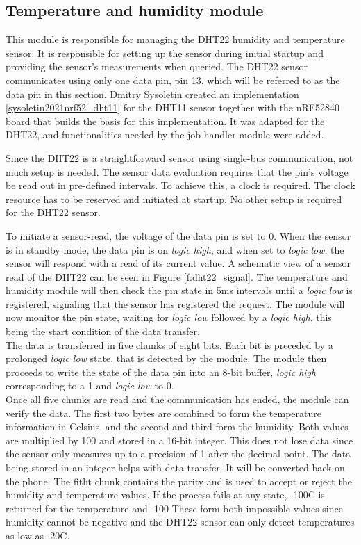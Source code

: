 \subsection{Temperature and humidity module}
\label{ss:temp_hum_module}
This module is responsible for managing the DHT22 humidity and temperature sensor.
It is responsible for setting up the sensor during initial startup and providing the sensor's measurements when queried.
The DHT22 sensor communicates using only one data pin, pin 13, which will be referred to as the data pin in this section.
Dmitry Sysoletin created an implementation \ref{sysoletin2021nrf52_dht11} for the DHT11 sensor together with the nRF52840 board that builds the basis for this implementation.
It was adapted for the DHT22, and functionalities needed by the job handler module were added.


Since the DHT22 is a straightforward sensor using single-bus communication, not much setup is needed.
The sensor data evaluation requires that the pin's voltage be read out in pre-defined intervals.
To achieve this, a clock is required.
The clock resource has to be reserved and initiated at startup.
No other setup is required for the DHT22 sensor.


To initiate a sensor-read, the voltage of the data pin is set to 0.
When the sensor is in standby mode, the data pin is on \textit{logic high}, and when set to \textit{logic low}, the sensor will respond with a read of its current value.
A schematic view of a sensor read of the DHT22 can be seen in Figure \ref{f:dht22_signal}.
The temperature and humidity module will then check the pin state in 5ms intervals until a \textit{logic low} is registered, signaling that the sensor has registered the request. 
The module will now monitor the pin state, waiting for \textit{logic low} followed by a \textit{logic high}, this being the start condition of the data transfer. \\
The data is transferred in five chunks of eight bits.
Each bit is preceded by a prolonged \textit{logic low} state, that is detected by the module.
The module then proceeds to write the state of the data pin into an 8-bit buffer, \textit{logic high} corresponding to a 1 and \textit{logic low} to 0.\\
Once all five chunks are read and the communication has ended,  the module can verify the data.
The first two bytes are combined to form the temperature information in Celsius, and the second and third form the humidity.
Both values are multiplied by 100 and stored in a 16-bit integer. 
This does not lose data since the sensor only measures up to a precision of 1 after the decimal point.
The data being stored in an integer helps with data transfer.
It will be converted back on the phone.
The fitht chunk contains the parity and is used to accept or reject the humidity and temperature values.
If the process fails at any state, -100\degree C is returned for the temperature and -100%
These form both impossible values since humidity cannot be negative and the DHT22 sensor can only detect temperatures as low as -20\degree C.


